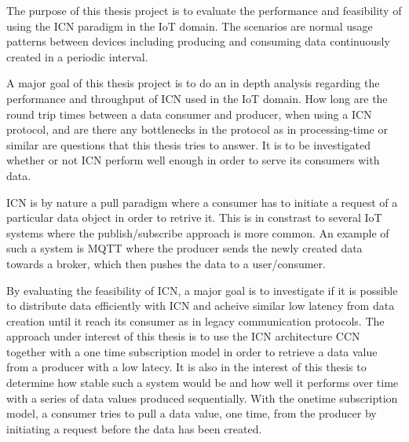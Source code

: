 The purpose of this thesis project is to evaluate the performance and feasibility of using the ICN paradigm in the IoT domain. The scenarios are normal usage patterns between devices including producing and consuming data continuously created in a periodic interval. 

A major goal of this thesis project is to do an in depth analysis regarding the performance and throughput of ICN used in the IoT domain. How long are the round trip times between a data consumer and producer, when using a ICN protocol, and are there any bottlenecks in the protocol as in processing-time or similar are questions that this thesis tries to answer. It is to be investigated whether or not ICN perform well enough in order to serve its consumers with data.

ICN is by nature a pull paradigm where a consumer has to initiate a request of a particular data object in order to retrive it. This is in constrast to several IoT systems where the publish/subscribe approach is more common. An example of such a system is MQTT \cite{mqtt} where the producer sends the newly created data towards a broker, which then pushes the data to a user/consumer. 

By evaluating the feasibility of ICN, a major goal is to investigate if it is possible to distribute data efficiently with ICN and acheive similar low latency from data creation until it reach its consumer as in legacy communication protocols. The approach under interest of this thesis is to use the ICN architecture CCN \cite{CCN-LITE} together with a one time subscription model in order to retrieve a data value from a producer with a low latecy. It is also in the interest of this thesis to determine how stable such a system would be and how well it performs over time with a series of data values produced sequentially. With the onetime subscription model, a consumer tries to pull a data value, one time, from the producer by initiating a request before the data has been created.



